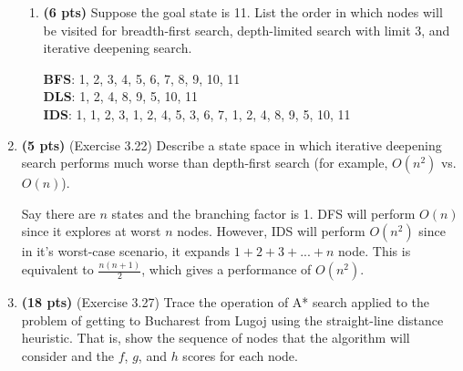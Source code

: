 \documentclass{article}
\begin{document}
\begin{enumerate}
\begin{enumerate}[label=($\alph*$)]


    \item \textbf{(6 pts)} Suppose the goal state is 11. List the order in which nodes will be visited for breadth-first search, depth-limited search with limit 3, and iterative deepening search.

    \color{blue}
        \textbf{BFS}: 1, 2, 3, 4, 5, 6, 7, 8, 9, 10, 11\\
        \textbf{DLS}: 1, 2, 4, 8, 9, 5, 10, 11\\
        \textbf{IDS}: 1, 1, 2, 3, 1, 2, 4, 5, 3, 6, 7, 1, 2, 4, 8, 9, 5, 10, 11
    \color{black}


    \end{enumerate}



\item \textbf{(5 pts)} (Exercise 3.22) Describe a state space in which iterative deepening search performs much worse than depth-first search (for example, $O(n^2)$ vs. $O(n)$).

\color{blue}
    Say there are $n$ states and the branching factor is 1. DFS will perform $O(n)$ since it explores at worst $n$ nodes. However, IDS will perform $O(n^2)$ since in it's worst-case scenario, it expands $1+2+3+...+n$ node. This is equivalent to $\frac{n(n+1)}{2}$, which gives a performance of $O(n^2)$.
\color{black}



\item \textbf{(18 pts)} (Exercise 3.27) Trace the operation of A* search applied to the problem of getting to Bucharest from Lugoj using the straight-line distance heuristic. That is, show the sequence of nodes that the algorithm will consider and the $f$, $g$, and $h$ scores for each node.


\end{enumerate}
\end{document}
